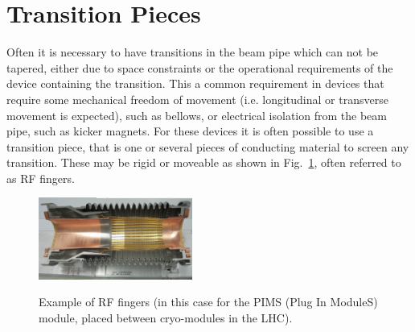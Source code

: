 \section{Transition Pieces}
\label{sec:transitions}

Often it is necessary to have transitions in the beam pipe which can not be tapered, either due to space constraints or the operational requirements of the device containing the transition. This a common requirement in devices that require some mechanical freedom of movement (i.e. longitudinal or transverse movement is expected), such as bellows, or electrical isolation from the beam pipe, such as kicker magnets. For these devices it is often possible to use a transition piece, that is one or several pieces of conducting material to screen any transition. These may be rigid or moveable as shown in Fig.~\ref{fig:rf_fingers}, often referred to as RF fingers.

\begin{figure}
\begin{center}
\includegraphics[width=0.45\textwidth]{Beam_Coupling_Impedance_Reduction_Techniques/figures/pimsImage.png}
\label{fig:rf_fingers}
\end{center}
\caption{Example of RF fingers (in this case for the PIMS (Plug In ModuleS) module, placed between cryo-modules in the LHC).}
\end{figure}


